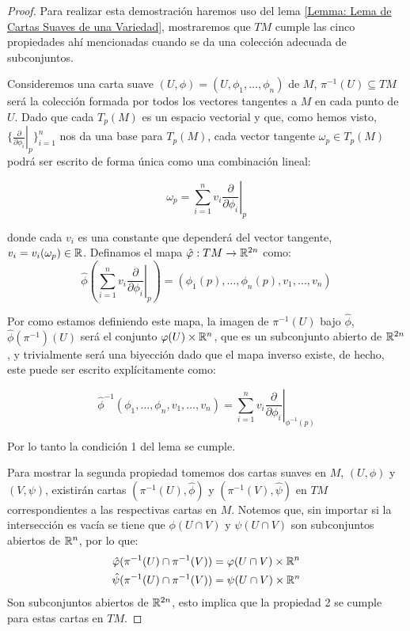 \begin{proof}
	Para realizar esta demostración haremos uso del lema \ref{Lemma: Lema de Cartas Suaves de una Variedad}, mostraremos que $TM$ cumple las cinco propiedades ahí mencionadas cuando se da una colección adecuada de subconjuntos.

	Consideremos una carta suave $(U,\phi)=(U,\phi_1,\dots,\phi_n)$ de $M$, $\pi^{-1}(U) \subseteq TM$ será la colección formada por todos los vectores tangentes a $M$ en cada punto de $U$. Dado que cada $T_p(M)$ es un espacio vectorial y que, como hemos visto, $\{\left. \frac{\partial}{\partial \phi_{i}} \right|_{p}\}_{i=1}^{n}$ nos da una base para $T_p(M)$, cada vector tangente $\omega_p \in T_p(M)$ podrá ser escrito de forma única como una combinación lineal:

	\[
		\omega_p = \sum_{i=1}^{n} v_i \left. \frac{\partial}{\partial \phi_{i}}\right|_{p}
	\]

	donde cada $v_i$ es una constante que dependerá del vector tangente, $v_i = v_i(\omega_p) \in \mathbb{R}$. Definamos el mapa $\hat{\varphi}: TM \to \mathbb{R}^{2n}$ como:
	\[
		\hat{\phi} \left(\sum_{i=1}^{n} v_i \left. \frac{\partial}{\partial \phi_{i}}\right|_{p} \right) = \left(\phi_1(p), \dots, \phi_n(p), v_1, \dots, v_n \right)
	\]

	Por como estamos definiendo este mapa, la imagen de $\pi^{-1}(U)$ bajo $\hat{\phi}$, $\hat{\phi}(\pi^{-1})(U)$ será el conjunto $\varphi(U) \times \mathbb{R}^n$, que es un subconjunto abierto de $\mathbb{R}^{2n}$, y trivialmente será una biyección dado que el mapa inverso existe, de hecho, este puede ser escrito explícitamente como:

	\[ \hat{\phi}^{-1}(\phi_{1},\dots, \phi_{n}, v_1, \dots, v_n ) = \sum_{i=1}^{n} v_i \left. \frac{\partial}{\partial \phi_i} \right|_{\phi^{-1}(p)}\]

	Por lo tanto la condición 1 del lema se cumple.

	Para mostrar la segunda propiedad tomemos dos cartas suaves en $M$, $(U,\phi)$ y $(V,\psi)$, existirán cartas $(\pi^{-1}(U),\hat{\phi})$ y $(\pi^{-1}(V),\hat{\psi})$ en $TM$ correspondientes a las respectivas cartas en $M$. Notemos que, sin importar si la intersección es vacía se tiene que $\phi(U \cap V)$ y $\psi(U \cap V)$ son subconjuntos abiertos de $\mathbb{R}^n$, por lo que:
	\begin{align*}
		\hat{\varphi}(\pi^{-1}(U) \cap \pi^{-1}(V)) & =
		\varphi(U \cap V) \times \mathbb{R}^n                   \\
		\hat{\psi}(\pi^{-1}(U) \cap \pi^{-1}(V)) & =
		\psi(U \cap V) \times \mathbb{R}^n                   \\
	\end{align*}
	Son subconjuntos abiertos de $\mathbb{R}^{2n}$, esto implica que la propiedad 2 se cumple para estas cartas en $TM$.


\end{proof}

